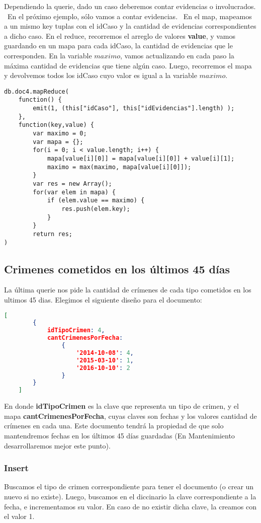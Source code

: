 \documentclass[11pt, a4paper]{article}
\begin{document}
Dependiendo la querie, dado un caso deberemos contar evidencias o involucrados. \
En el próximo ejemplo, sólo vamos a contar evidencias. \
En el map, mapeamos a un mismo key tuplas con el idCaso y la cantidad de evidencias correspondientes a dicho caso. En el reduce, recorremos el arreglo de valores \textbf{value}, y vamos guardando en un mapa para cada idCaso, la cantidad de evidencias que le corresponden. En la variable $maximo$, vamos actualizando en cada paso la máxima cantidad de evidencias que tiene algún caso. Luego, recorremos el mapa y devolvemos todos los idCaso cuyo valor es igual a la variable $maximo$.
\begin{lstlisting}
db.doc4.mapReduce(
    function() {
        emit(1, (this["idCaso"], this["idEvidencias"].length) );
    },
    function(key,value) { 
        var maximo = 0;
        var mapa = {};
        for(i = 0; i < value.length; i++) {
            mapa[value[i][0]] = mapa[value[i][0]] + value[i][1];
            maximo = max(maximo, mapa[value[i][0]]);
        }
        var res = new Array();
        for(var elem in mapa) {
        	if (elem.value == maximo) {
        		res.push(elem.key);
        	}
        }
        return res;
)
\end{lstlisting}

\subsection{Crimenes cometidos en los \'ultimos 45 d\'ias}

La \'ultima querie nos pide la cantidad de cr\'imenes de cada tipo cometidos en los ultimos 45 dias. Elegimos el siguiente dise\~no para el documento:

\begin{lstlisting}[language=json]
	[
		{
			idTipoCrimen: 4,
			cantCrimenesPorFecha:
				{
					'2014-10-08': 4,
					'2015-03-10': 1,
					'2016-10-10': 2
				}
		}
	]
\end{lstlisting}

En donde \textbf{idTipoCrimen} es la clave que representa un tipo de crimen, y el mapa \textbf{cantCrimenesPorFecha}, cuyas claves son fechas y los valores cantidad de cr\'imenes en cada una. Este documento tendr\'a la propiedad de que solo mantendremos fechas en los \'ultimos 45 d\'ias guardadas (En Mantenimiento desarrollaremos mejor este punto).

\subsubsection{Insert}
Buscamos el tipo de crimen correspondiente para tener el documento (o crear un nuevo si no existe). Luego, buscamos en el diccinario la clave correspondiente a la fecha, e incrementamos su valor. En caso de no existir dicha clave, la creamos con el valor 1.
\end{document}
